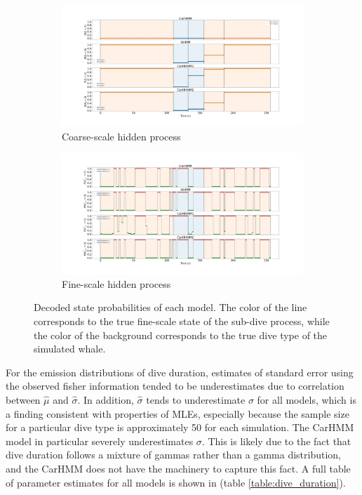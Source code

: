 \begin{figure}[ht]
    \centering
    \begin{subfigure}[t]{1.0\textwidth}
        \centering
        \includegraphics[width=5in]{Plots/Posterior_Coarse_States.png}
        \caption{Coarse-scale hidden process}
    \end{subfigure}
    \newline
    \begin{subfigure}[t]{1.0\textwidth}
        \centering
        \includegraphics[width=5in]{Plots/Posterior_Fine_States.png}
        \caption{Fine-scale hidden process}
    \end{subfigure}
	\caption{Decoded state probabilities of each model. The color of the line corresponds to the true fine-scale state of the sub-dive process, while the color of the background corresponds to the true dive type of the simulated whale.}
	\label{fig:acc}
\end{figure}

For the emission distributions of dive duration, estimates of standard error using the observed fisher information tended to be underestimates due to correlation between $\hat \mu$ and $\hat \sigma$. In addition, $\hat \sigma$ tends to underestimate $\sigma$ for all models, which is a finding consistent with properties of MLEs, especially because the sample size for a particular dive type is approximately 50 for each simulation. The CarHMM model in particular severely underestimates $\sigma$. This is likely due to the fact that dive duration follows a mixture of gammas rather than a gamma distribution, and the CarHMM does not have the machinery to capture this fact. A full table of parameter estimates for all models is shown in (table \ref{table:dive_duration}).


